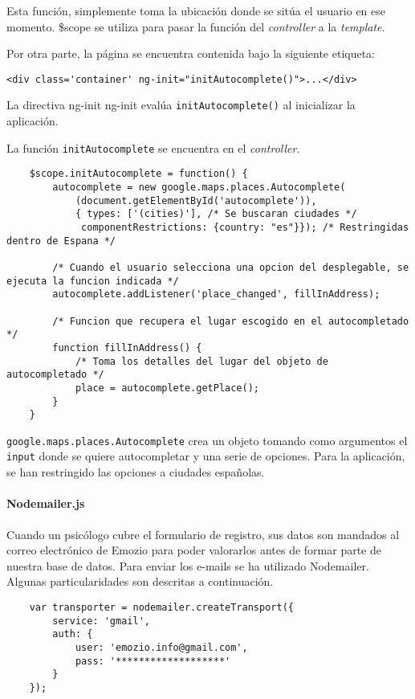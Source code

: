 Esta función, simplemente toma la ubicación donde se sitúa el usuario en ese momento. \$scope se utiliza para pasar la función del \textit{controller} a la \textit{template}.


Por otra parte, la página se encuentra contenida bajo la siguiente etiqueta:


\medskip
\begin{lstlisting}
<div class='container' ng-init="initAutocomplete()">...</div>
\end{lstlisting}


La directiva ng-init ng-init evalúa \texttt{initAutocomplete()} al inicializar la aplicación.


La función \texttt{initAutocomplete} se encuentra en el \textit{controller}.


\medskip
\begin{lstlisting}
	$scope.initAutocomplete = function() {
		autocomplete = new google.maps.places.Autocomplete(
			(document.getElementById('autocomplete')),
			{ types: ['(cities)'], /* Se buscaran ciudades */
			 componentRestrictions: {country: "es"}}); /* Restringidas dentro de Espana */

		/* Cuando el usuario selecciona una opcion del desplegable, se ejecuta la funcion indicada */
		autocomplete.addListener('place_changed', fillInAddress);

		/* Funcion que recupera el lugar escogido en el autocompletado */
		function fillInAddress() {
			/* Toma los detalles del lugar del objeto de autocompletado */
			place = autocomplete.getPlace();
		}
	}
\end{lstlisting}


\texttt{google.maps.places.Autocomplete} crea un objeto tomando como argumentos el \texttt{input} donde se quiere autocompletar y una serie de opciones. Para la aplicación, se han restringido las opciones a ciudades españolas.


\paragraph*{Nodemailer.js}
Cuando un psicólogo cubre el formulario de registro, sus datos son mandados al correo electrónico de Emozio para poder valorarlos antes de formar parte de nuestra base de datos. Para enviar los e-mails se ha utilizado Nodemailer. Algunas particularidades son descritas a continuación.


\medskip
\begin{lstlisting}
	var transporter = nodemailer.createTransport({ 
		service: 'gmail', 
		auth: { 
			user: 'emozio.info@gmail.com', 
			pass: '*******************' 
		} 
	});
\end{lstlisting}


